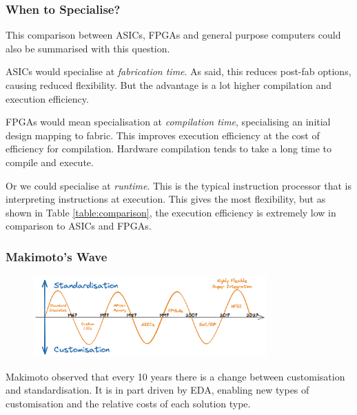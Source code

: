 \documentclass[a4paper]{scrartcl}
\begin{document}
\subsubsection{When to Specialise?}

This comparison between ASICs, FPGAs and general purpose computers could also be summarised with this question. 

ASICs would specialise at \emph{fabrication time}. As said, this reduces post-fab options, 
causing reduced flexibility. But the advantage is a lot higher compilation and execution
efficiency. 

FPGAs would mean specialisation at \emph{compilation time}, specialising an initial design
mapping to fabric. This improves execution efficiency at the cost of efficiency for
compilation. Hardware compilation tends to take a long time to compile and execute. 

Or we could specialise at \emph{runtime}. This is the typical instruction processor
that is interpreting instructions at execution. This gives the most flexibility,
but as shown in Table \ref{table:comparison}, the execution efficiency is extremely
low in comparison to ASICs and FPGAs. 


\subsubsection{Makimoto's Wave}
\begin{figure}[H]
    \centering
    \includegraphics[width=0.8\textwidth]{figures/L1-Makimito.png}
\end{figure}
Makimoto observed that every 10 years there is a change between customisation and standardisation.
It is in part driven by EDA, enabling new types of customisation and the relative costs of each 
solution type.
\end{document}
